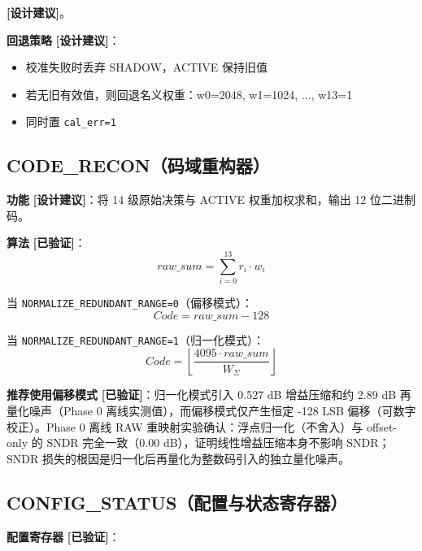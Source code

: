 \documentclass[UTF8,a4paper,11pt]{ctexart}
\newcommand{\verified}{\textcolor{verifiedgreen}{\textbf{[已验证]}}}
\newcommand{\suggested}{\textcolor{suggestblue}{\textbf{[设计建议]}}}
\begin{document}
 \suggested。

\textbf{回退策略} \suggested：
\begin{itemize}[leftmargin=2em]
\item 校准失败时丢弃 SHADOW，ACTIVE 保持旧值
\item 若无旧有效值，则回退名义权重：w0=2048, w1=1024, ..., w13=1
\item 同时置 \texttt{cal\_err=1}
\end{itemize}

\subsection{CODE\_RECON（码域重构器）}

\textbf{功能} \suggested：将 14 级原始决策与 ACTIVE 权重加权求和，输出 12 位二进制码。

\textbf{算法} \verified：
\begin{equation}
raw\_sum = \sum_{i=0}^{13} r_i \cdot w_i
\label{eq:raw-sum}
\end{equation}

当 \texttt{NORMALIZE\_REDUNDANT\_RANGE=0}（偏移模式）：
\begin{equation}
Code = raw\_sum - 128
\label{eq:offset-mode}
\end{equation}

当 \texttt{NORMALIZE\_REDUNDANT\_RANGE=1}（归一化模式）：
\begin{equation}
Code = \left\lfloor \frac{4095 \cdot raw\_sum}{W_\Sigma} \right\rfloor
\label{eq:normalize-mode}
\end{equation}

\textbf{推荐使用偏移模式} \verified：归一化模式引入 0.527 dB 增益压缩和约 2.89 dB 再量化噪声（Phase 0 离线实测值），而偏移模式仅产生恒定 -128 LSB 偏移（可数字校正）。Phase 0 离线 RAW 重映射实验确认：浮点归一化（不舍入）与 offset-only 的 SNDR 完全一致（0.00 dB），证明线性增益压缩本身不影响 SNDR；SNDR 损失的根因是归一化后再量化为整数码引入的独立量化噪声。

\subsection{CONFIG\_STATUS（配置与状态寄存器）}

\textbf{配置寄存器} \verified：
\end{document}
